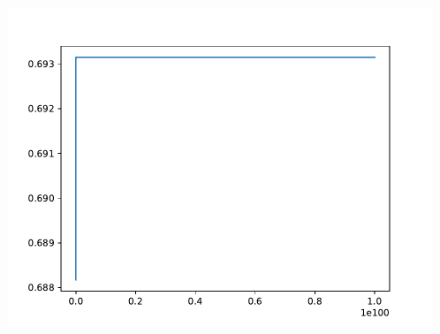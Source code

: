     \begin{figure}[h!]
        \centering
        \includegraphics[width=\textwidth]{./figures/entropy.pdf}
    \end{figure} \ \\ 

